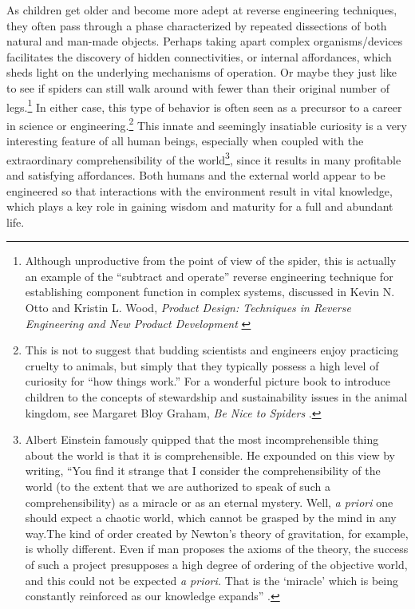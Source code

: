 As children get older and become more adept at reverse engineering
techniques, they often pass through a phase characterized by repeated
dissections of both natural and man-made objects. Perhaps taking apart
complex organisms/devices facilitates the discovery of hidden
connectivities, or internal affordances, which sheds light on the
underlying mechanisms of operation. Or maybe they just like to see if
spiders can still walk around with fewer than their original number of
legs.\footnote{Although unproductive from the point of view of the
spider, this is actually an example of the “subtract and operate”
reverse engineering technique for establishing component function in
complex systems, discussed in Kevin N. Otto and Kristin L. Wood,
\textit{Product Design: Techniques in Reverse Engineering and New Product Development} \citep[][pp. 159--162, 204--211]{ottowood2001}}
In either case, this type of behavior is often
seen as a precursor to a career in science or
engineering.\footnote{%
This is not to suggest that budding scientists and
engineers enjoy practicing cruelty to animals, but simply that they
typically possess a high level of curiosity for “how things work.” For
a wonderful picture book to introduce children to the concepts of
stewardship and sustainability issues in the animal kingdom, see
Margaret Bloy Graham, \textit{Be Nice to Spiders} \citep{graham1967}.
}
This innate and seemingly insatiable
curiosity is a very interesting feature of all human beings, especially
when coupled with the extraordinary comprehensibility of the
world\footnote{%
Albert Einstein famously quipped that the most
incomprehensible thing about the world is that it is comprehensible. He
expounded on this view by writing, ``You find it strange that I consider
the comprehensibility of the world (to the extent that we are
authorized to speak of such a comprehensibility) as a miracle or as an
eternal mystery. Well, \textit{a priori} one should expect a chaotic
world, which cannot be grasped by the mind in any way.{\jdots}The
kind of order created by Newton's theory of
gravitation, for example, is wholly different. Even if man proposes the
axioms of the theory, the success of such a project presupposes a high
degree of ordering of the objective world, and this could not be
expected \textit{a priori.} That is the
`miracle' which is being constantly
reinforced as our knowledge expands'' \citep[][p.~131]{einstein1987}.
}, since it results in many profitable and
satisfying affordances. Both humans and the external world appear to be
engineered so that interactions with the environment result in vital
knowledge, which plays a key role in gaining wisdom and maturity for a
full and abundant life.  %

